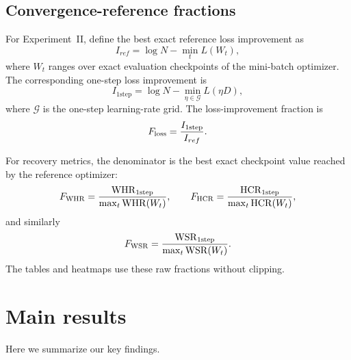 \documentclass[11pt]{article}
\newcommand{\one}{\mathrm{1step}}
\begin{document}
\subsection{Convergence-reference fractions}

For Experiment~II, define the best exact reference loss improvement as
\[
  I_{ref}=\log N-\min_t L(W_t),
\]
where $W_t$ ranges over exact evaluation checkpoints of the mini-batch
optimizer.  The corresponding one-step loss improvement is
\[
  I_{\one}
  =
  \log N-\min_{\eta\in\mathcal{G}}L(\eta D),
\]
where $\mathcal{G}$ is the one-step learning-rate grid.  The loss-improvement
fraction is
\[
  F_{\rm loss}=\frac{I_{\one}}{I_{ref}}.
\]

For recovery metrics, the denominator is the best exact checkpoint value
reached by the reference optimizer:
\[
  F_{\rm WHR}
  =
  \frac{\mathrm{WHR}_{\one}}
       {\max_t \mathrm{WHR}(W_t)},
  \qquad
  F_{\rm HCR}
  =
  \frac{\mathrm{HCR}_{\one}}
       {\max_t \mathrm{HCR}(W_t)},
\]
and similarly
\[
  F_{\rm WSR}
  =
  \frac{\mathrm{WSR}_{\one}}
       {\max_t \mathrm{WSR}(W_t)} .
\]
The tables and heatmaps use these raw fractions without clipping.

\section{Main results}
Here we summarize our key findings.
\end{document}

